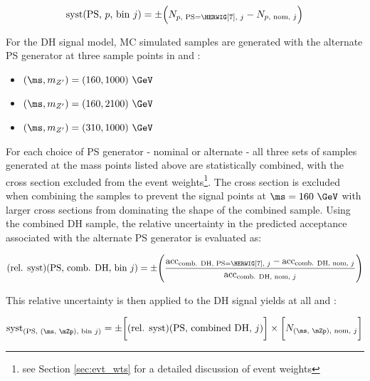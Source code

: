 \begin{equation}
\label{eq:ME_syst}
\text{syst}\text{(PS, \(p\), bin \(j\))}= \pm \Big(N_\text{\(p\), PS=\HERWIG[7], \(j\)} - N_\text{\(p\), nom, \(j\)}\Big)
\end{equation}

For the DH signal model, MC simulated samples are generated with the alternate \HERWIG[7] PS generator at three sample points in \ms and \mZp:

\begin{itemize}
\item \((\ms, m_{Z'}) = (160, 1000)~\GeV\)
\item \((\ms, m_{Z'}) = (160, 2100)~\GeV\)
\item \((\ms, m_{Z'}) = (310, 1000)~\GeV\)
\end{itemize}

For each choice of PS generator - nominal or alternate - all three sets of samples generated at the mass points listed above are statistically combined, with the cross section excluded from the event weights\footnote{see Section \ref{sec:evt_wts} for a detailed discussion of event weights}. The cross section is excluded when combining the samples to prevent the signal points at \(\ms=160~\GeV\) with larger cross sections from dominating the shape of the combined sample. Using the combined DH sample, the relative uncertainty in the predicted acceptance associated with the alternate PS generator is evaluated as:

\begin{small}
\begin{equation}
\label{eq:ME_syst}
\text{(rel. syst)}\text{(PS, comb. DH, bin \(j\))}= \pm \Bigg( \frac{\text{acc}_\text{comb. DH, PS=\HERWIG[7], \(j\)} - \text{acc}_\text{comb. DH, nom, \(j\)}}{\text{acc}_\text{comb. DH, nom, \(j\)}} \Bigg)
\end{equation}
\end{small}

\noindent This relative uncertainty is then applied to the DH signal yields at all \ms and \mZp:

\begin{small}
\begin{equation}
\label{eq:ckkw_wjets}
\text{syst}_\text{(PS, (\ms, \mZp), bin \(j\))} = \pm \bigg[\text{(rel. syst)}\text{(PS, combined DH, \(j\))}\bigg] \times \bigg[N_\text{(\ms, \mZp), nom, \(j\)}\bigg]
\end{equation}
\end{small}

